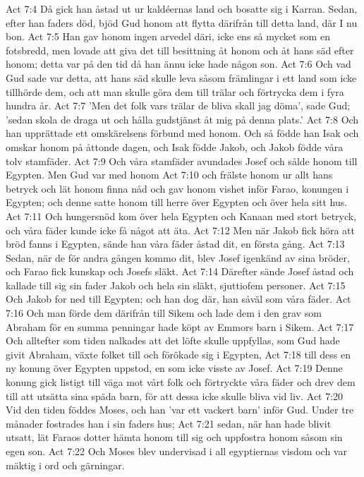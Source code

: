 Act 7:4  Då gick han åstad ut ur kaldéernas land och bosatte sig i Karran. Sedan, efter han faders död, bjöd Gud honom att flytta därifrån till detta land, där I nu bon.
Act 7:5  Han gav honom ingen arvedel däri, icke ens så mycket som en fotsbredd, men lovade att giva det till besittning åt honom och åt hans säd efter honom; detta var på den tid då han ännu icke hade någon son.
Act 7:6  Och vad Gud sade var detta, att hans säd skulle leva såsom främlingar i ett land som icke tillhörde dem, och att man skulle göra dem till trälar och förtrycka dem i fyra hundra år.
Act 7:7  'Men det folk vars trälar de bliva skall jag döma', sade Gud; 'sedan skola de draga ut och hålla gudstjänst åt mig på denna plats.'
Act 7:8  Och han upprättade ett omskärelsens förbund med honom. Och så födde han Isak och omskar honom på åttonde dagen, och Isak födde Jakob, och Jakob födde våra tolv stamfäder.
Act 7:9  Och våra stamfäder avundades Josef och sålde honom till Egypten. Men Gud var med honom
Act 7:10  och frälste honom ur allt hans betryck och lät honom finna nåd och gav honom vishet inför Farao, konungen i Egypten; och denne satte honom till herre över Egypten och över hela sitt hus.
Act 7:11  Och hungersnöd kom över hela Egypten och Kanaan med stort betryck, och våra fäder kunde icke få något att äta.
Act 7:12  Men när Jakob fick höra att bröd fanns i Egypten, sände han våra fäder åstad dit, en första gång.
Act 7:13  Sedan, när de för andra gången kommo dit, blev Josef igenkänd av sina bröder, och Farao fick kunskap och Josefs släkt.
Act 7:14  Därefter sände Josef åstad och kallade till sig sin fader Jakob och hela sin släkt, sjuttiofem personer.
Act 7:15  Och Jakob for ned till Egypten; och han dog där, han såväl som våra fäder.
Act 7:16  Och man förde dem därifrån till Sikem och lade dem i den grav som Abraham för en summa penningar hade köpt av Emmors barn i Sikem.
Act 7:17  Och alltefter som tiden nalkades att det löfte skulle uppfyllas, som Gud hade givit Abraham, växte folket till och förökade sig i Egypten,
Act 7:18  till dess en ny konung över Egypten uppstod, en som icke visste av Josef.
Act 7:19  Denne konung gick listigt till väga mot vårt folk och förtryckte våra fäder och drev dem till att utsätta sina späda barn, för att dessa icke skulle bliva vid liv.
Act 7:20  Vid den tiden föddes Moses, och han 'var ett vackert barn' inför Gud. Under tre månader fostrades han i sin faders hus;
Act 7:21  sedan, när han hade blivit utsatt, lät Faraos dotter hämta honom till sig och uppfostra honom såsom sin egen son.
Act 7:22  Och Moses blev undervisad i all egyptiernas visdom och var mäktig i ord och gärningar.
